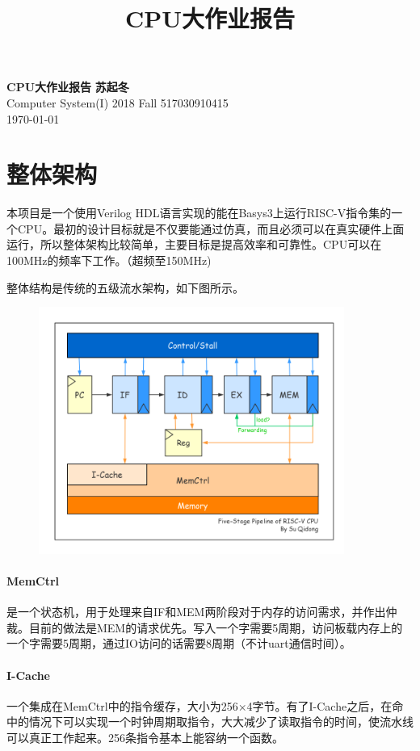 \documentclass[UTF8]{ctexart}
\title{CPU大作业报告}
\begin{document}
\noindent
\large\textbf{CPU大作业报告} \hfill \textbf{苏起冬} \\
\normalsize Computer System(I) 2018 Fall \hfill 517030910415 \\
\today
	
\section{整体架构}

	本项目是一个使用Verilog HDL语言实现的能在Basys3上运行RISC-V指令集的一个CPU。最初的设计目标就是不仅要能通过仿真，而且必须可以在真实硬件上面运行，所以整体架构比较简单，主要目标是提高效率和可靠性。CPU可以在100MHz的频率下工作。（超频至150MHz)
	
	整体结构是传统的五级流水架构，如下图所示。
	\begin{figure}[h]
	\centering
	\includegraphics[width=10cm]{arch.png}
	\end{figure}
	
	\paragraph{MemCtrl} 是一个状态机，用于处理来自IF和MEM两阶段对于内存的访问需求，并作出仲裁。目前的做法是MEM的请求优先。写入一个字需要5周期，访问板载内存上的一个字需要5周期，通过IO访问的话需要8周期（不计uart通信时间）。
	\paragraph{I-Cache} 一个集成在MemCtrl中的指令缓存，大小为256×4字节。有了I-Cache之后，在命中的情况下可以实现一个时钟周期取指令，大大减少了读取指令的时间，使流水线可以真正工作起来。256条指令基本上能容纳一个函数。
	
\end{document}
